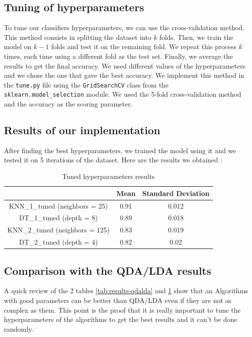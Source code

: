 \documentclass[12pt]{article}
\begin{document}
\subsection{Tuning of hyperparameters}
	To tune our classifiers hyperparameters, we can use the cross-validation method.
	This method consists in splitting the dataset into $k$ folds.
	Then, we train the model on $k-1$ folds and test it on the remaining fold.
	We repeat this process $k$ times, each time using a different fold as the test set.
	Finally, we average the results to get the final accuracy. We used different values of the hyperparameters and we chose the one that gave the best accuracy.
	We implement this method in the \verb|tune.py| file using
	the \verb|GridSearchCV| class from the \verb|sklearn.model_selection| module. We used the 5-fold cross-validation method and the accuracy as the scoring parameter.
\subsection{Results of our implementation} 
	After finding the best hyperparameters, we trained the model using it and we tested it on 5 iterations of the dataset. Here are the results we obtained :
	\begin{table}[!h]
		\centering
		\begin{tabular}{|c|c|c|}
		\hline
								           & Mean & Standard Deviation \\ \hline
		KNN\_1\_tuned (neighbors = 25)       	& 0.91 & 0.012             \\ \hline
		DT\_1\_tuned (depth = 8)              & 0.89 & 0.018						  \\ \hline
		KNN\_2\_tuned (neighbors = 125)       & 0.83 & 0.019              \\ \hline
		DT\_2\_tuned (depth = 4)              & 0.82 & 0.02						  \\ \hline

		\end{tabular}
		\caption{Tuned hyperparameters results}
		\label{tab:results-tune}	
	\end{table}

\subsection{Comparison with the QDA/LDA results}
A quick review of the 2 tables \ref{tab:results-qdalda} and \ref{tab:results-tune} show that an Algorithms with good parameters can be better than QDA/LDA even if they are not as complex as them.
This point is the proof that it is really important to tune the hyperparameters of the algorithms to get the best results and it can't be done randomly.
\end{document}
